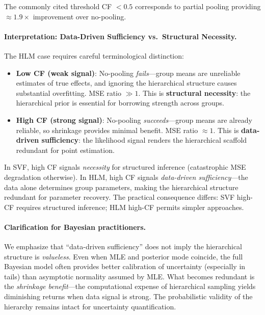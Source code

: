 \documentclass[10pt]{article} %
\theoremstyle{plain}
\theoremstyle{definition}
\begin{document}
\noindent The commonly cited threshold CF $< 0.5$ corresponds to partial pooling providing $\approx 1.9\times$ improvement over no-pooling.

\paragraph{Interpretation: Data-Driven Sufficiency vs.\ Structural Necessity.} The HLM case requires careful terminological distinction:

\begin{itemize}
    \item \textbf{Low CF (weak signal)}: No-pooling \emph{fails}---group means are unreliable estimates of true effects, and ignoring the hierarchical structure causes substantial overfitting. MSE ratio $\gg 1$. This is \textbf{structural necessity}: the hierarchical prior is essential for borrowing strength across groups.
    
    \item \textbf{High CF (strong signal)}: No-pooling \emph{succeeds}---group means are already reliable, so shrinkage provides minimal benefit. MSE ratio $\approx 1$. This is \textbf{data-driven sufficiency}: the likelihood signal renders the hierarchical scaffold redundant for point estimation.
\end{itemize}

\noindent In SVF, high CF signals \emph{necessity} for structured inference (catastrophic MSE degradation otherwise). In HLM, high CF signals \emph{data-driven sufficiency}---the data alone determines group parameters, making the hierarchical structure redundant for parameter recovery. The practical consequence differs: SVF high-CF requires structured inference; HLM high-CF permits simpler approaches.

\paragraph{Clarification for Bayesian practitioners.} We emphasize that ``data-driven sufficiency'' does not imply the hierarchical structure is \emph{valueless}. Even when MLE and posterior mode coincide, the full Bayesian model often provides better calibration of uncertainty (especially in tails) than asymptotic normality assumed by MLE. What becomes redundant is the \emph{shrinkage benefit}---the computational expense of hierarchical sampling yields diminishing returns when data signal is strong. The probabilistic validity of the hierarchy remains intact for uncertainty quantification.
\end{document}
